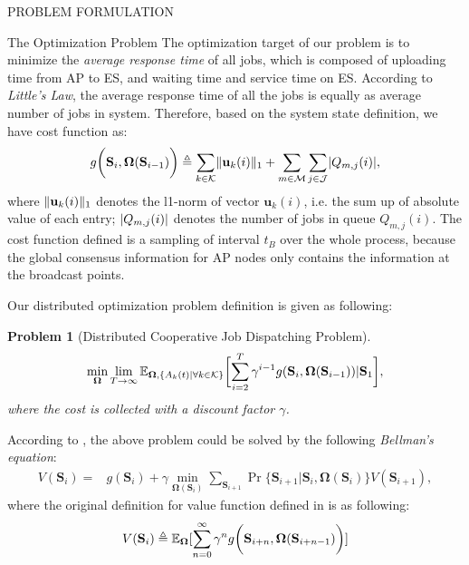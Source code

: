 \documentclass[10pt, conference, letterpaper]{IEEEtran}
\newtheorem{problem}{Problem}
\newcommand{\define}{\triangleq}
\renewcommand{\vec}{\mathbf}
\DeclarePairedDelimiter{\norm}{|}{|}
\DeclarePairedDelimiter{\Inorm}{\|}{\|_1}
\DeclarePairedDelimiter{\Paren}{\bigg(}{\bigg)}
\DeclarePairedDelimiter{\Bracket}{\bigg[}{\bigg]}
\newcommand{\apSet}{\mathcal{K}}
\newcommand{\esSet}{\mathcal{M}}
\newcommand{\jSpace}{\mathcal{J}}
\newcommand{\Stat}{\mathbf{S}}
\newcommand{\Policy}{\mathbf{\Omega}}
\begin{document}
\begin{section}{PROBLEM FORMULATION}
        \begin{subsection}{The Optimization Problem}
            The optimization target of our problem is to minimize the \emph{average response time} of all jobs, which is composed of uploading time from AP to ES, and waiting time and service time on ES. According to \emph{Little's Law}, the average response time of all the jobs is equally as average number of jobs in system. Therefore, based on the system state definition, we have cost function as:
            \begin{align}
                g \bigg( \Stat_{i}, \Policy(\Stat_{i-1}) \bigg) \define \sum_{k\in\apSet} \Inorm{\vec{u}_{k}(i)} + \sum_{m\in\esSet}\sum_{j\in\jSpace} \norm{Q_{m,j}(i)},
            \end{align}
            where $\Inorm{\vec{u}_{k}(i)}$ denotes the l1-norm of vector $\vec{u}_{k}(i)$, i.e. the sum up of absolute value of each entry; $\norm{Q_{m,j}(i)}$ denotes the number of jobs in queue $Q_{m,j}(i)$. The cost function defined is a sampling of interval $t_B$ over the whole process, because the global consensus information for AP nodes only contains the information at the broadcast points.

            Our distributed optimization problem definition is given as following:
            \begin{problem}[Distributed Cooperative Job Dispatching Problem]
                \begin{gather}
                    \min_{\Policy} \lim_{T \to \infty}
                        \mathbb{E}_{\Policy, \{A_k(t)|\forall k\in\apSet\}}
                            \Bracket{\sum_{i=2}^{T} \gamma^{i-1} g(\Stat_{i}, \Policy(\Stat_{i-1}))|\Stat_1},
                \end{gather}
                where the cost is collected with a discount factor $\gamma$.
            \end{problem}

            According to \cite{sutton1998introduction}, the above problem could be solved by the following \emph{Bellman's equation}:
            \begin{align}
                V(\Stat_{i}) =& g(\Stat_i) + \gamma \min_{\Policy(\Stat_{i})} \sum_{\Stat_{i+1}} \Pr\{ \Stat_{i+1}|\Stat_{i}, \Policy(\Stat_{i}) \} V(\Stat_{i+1}),
            \end{align}
            where the original definition for value function defined in \cite{sutton1998introduction} is as following:
            \begin{align}
                V(\Stat_{i}) \define \mathbb{E}_{\Policy}[\sum_{n=0}^{\infty} \gamma^n g\Paren{\Stat_{i+n}, \Policy(\Stat_{i+n-1})}]
            \end{align}


\end{subsection}
\end{section}
\end{document}
